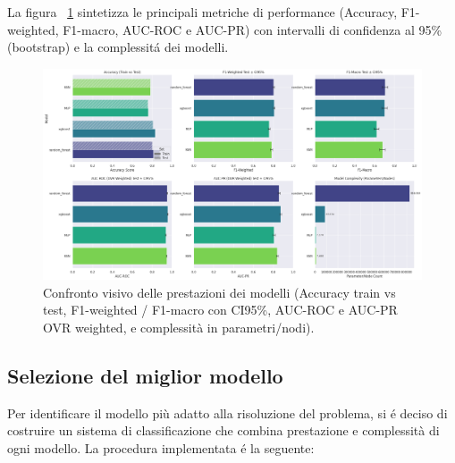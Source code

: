 \documentclass[a4paper,12pt]{report}
\begin{document}
	La figura ~\ref{fig:comparison_pm} sintetizza le principali metriche di performance (Accuracy, F1-weighted, F1-macro, AUC-ROC e AUC-PR) con intervalli di confidenza al 95\% (bootstrap) e la complessitá dei modelli.
	
	\begin{figure}[H]
		\centering
		\includegraphics[width=1.0\textwidth]{img/comparison_pm.png}
		\caption{Confronto visivo delle prestazioni dei modelli (Accuracy train vs test, F1-weighted / F1-macro con CI95\%, AUC-ROC e AUC-PR OVR weighted, e complessità in parametri/nodi).}
		\label{fig:comparison_pm}
	\end{figure}
	
	\subsection{Selezione del miglior modello}
	Per identificare il modello più adatto alla risoluzione del problema, si é deciso di costruire un sistema di classificazione che combina prestazione e complessità di ogni modello. La procedura implementata é la seguente:
	
\end{document}
